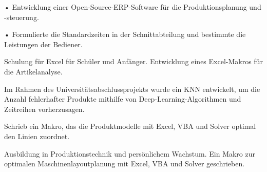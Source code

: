 \documentclass[11pt,a4paper,ragged2e,withhyper]{altacv}
\begin{document}
\begin{paracol}{2}



\large{}
\small{}
  
\par
  
• Entwicklung einer Open-Source-ERP-Software für die Produktionsplanung und -steuerung.\par\smallskip
• Formulierte die Standardzeiten in der Schnittabteilung und bestimmte die Leistungen der Bediener.



\divider
Schulung für Excel für Schüler und Anfänger. Entwicklung eines Excel-Makros für die Artikelanalyse.
\par


Im Rahmen des Universitätsabschlussprojekts wurde ein KNN entwickelt, um die Anzahl fehlerhafter Produkte mithilfe von Deep-Learning-Algorithmen und Zeitreihen vorherzusagen.

\divider

Schrieb ein Makro, das die Produktmodelle mit Excel, VBA und Solver optimal den Linien zuordnet.

\divider

Ausbildung in Produktionstechnik und persönlichem Wachstum. Ein Makro zur optimalen Maschinenlayoutplanung mit Excel, VBA und Solver geschrieben.


\end{paracol}
\end{document}
